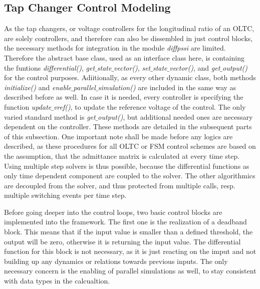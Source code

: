 \subsection{Tap Changer Control Modeling}
\label{sec:modeling-tap-changer-control}

As the tap changers, or voltage controllers for the longitudinal ratio of an \acs{OLTC}, are solely controllers, and therefore can also be dissembled in just control blocks, the necessary methods for integration in the module \textit{diffpssi} are limited.
Therefore the abstract base class, used as an interface class here, is containing the funtions \textit{differential()}, \textit{get$\_$state$\_$vector()}, \textit{set$\_$state$\_$vector()}, and \textit{get$\_$output()} for the control purposes.
Adiitionally, as every other dynamic class, both methods \textit{initialize()} and \textit{enable$\_$\-parallel$\_$\-simulation()} are included in the same way as described before as well.
In case it is needed, every controller is specifying the function \textit{update$\_$vref()}, to update the reference voltage of the control. 
The only varied standard method is \textit{get$\_$output()}, but additional needed ones are necessary dependent on the controller.
These methods are detailed in the subsequent parts of this subsection.
One important note shall be made before any logics are described, as these procedures for all \acs{OLTC} or \acs{FSM} control schemes are based on the assumption, that the admittance matrix is calculated at every time step.
Using multiple step solvers is thus possible, because the differential functions as only time dependent component are coupled to the solver.
The other algorithmics are decoupled from the solver, and thus protected from multiple calls, resp. multiple switching events per time step.

Before going deeper into the control loops, two basic control blocks are implemented into the framework.
The first one is the realization of a deadband block.
This means that if the input value is smaller than a defined threshold, the output will be zero, otherwise it is returning the input value.
The differential function for this block is not necessary, as it is just reacting on the imput and not building up any dynamics or relations towards previous inputs.
The only necessary concern is the enabling of parallel simulations as well, to stay consistent with data types in the calcualtion.

